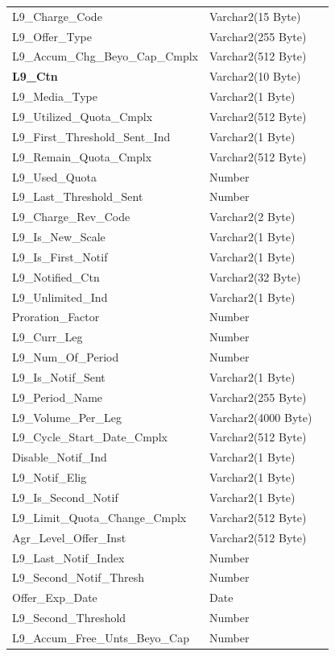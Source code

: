 \documentclass[12pt,twoside]{article}
\begin{document}
\begin{longtable}{l|l|l}
L9\_Charge\_Code & Varchar2(15 Byte) & \\
L9\_Offer\_Type & Varchar2(255 Byte) & \\
L9\_Accum\_Chg\_Beyo\_Cap\_Cmplx & Varchar2(512 Byte) & \\
\textbf{L9\_Ctn} & Varchar2(10 Byte) & \\
L9\_Media\_Type & Varchar2(1 Byte) & \\
L9\_Utilized\_Quota\_Cmplx & Varchar2(512 Byte) & \\
L9\_First\_Threshold\_Sent\_Ind & Varchar2(1 Byte) & \\
L9\_Remain\_Quota\_Cmplx & Varchar2(512 Byte) & \\
L9\_Used\_Quota & Number & \\
L9\_Last\_Threshold\_Sent & Number & \\
L9\_Charge\_Rev\_Code & Varchar2(2 Byte) & \\
L9\_Is\_New\_Scale & Varchar2(1 Byte) & \\
L9\_Is\_First\_Notif & Varchar2(1 Byte) & \\
L9\_Notified\_Ctn & Varchar2(32 Byte) & \\
L9\_Unlimited\_Ind & Varchar2(1 Byte) & \\
Proration\_Factor & Number & \\
L9\_Curr\_Leg & Number & \\
L9\_Num\_Of\_Period & Number & \\
L9\_Is\_Notif\_Sent & Varchar2(1 Byte) & \\
L9\_Period\_Name & Varchar2(255 Byte) & \\
L9\_Volume\_Per\_Leg & Varchar2(4000 Byte) & \\
L9\_Cycle\_Start\_Date\_Cmplx & Varchar2(512 Byte) & \\
Disable\_Notif\_Ind & Varchar2(1 Byte) & \\
L9\_Notif\_Elig & Varchar2(1 Byte) & \\
L9\_Is\_Second\_Notif & Varchar2(1 Byte) & \\
L9\_Limit\_Quota\_Change\_Cmplx & Varchar2(512 Byte) & \\
Agr\_Level\_Offer\_Inst & Varchar2(512 Byte) & \\
L9\_Last\_Notif\_Index & Number & \\
L9\_Second\_Notif\_Thresh & Number & \\
Offer\_Exp\_Date & Date & \\
L9\_Second\_Threshold & Number & \\
L9\_Accum\_Free\_Unts\_Beyo\_Cap & Number & \\

\end{longtable}
\end{document}
